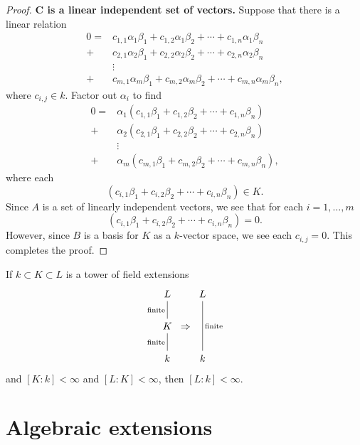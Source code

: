 \documentclass{ximera}
\begin{document}
\begin{lemma}
\begin{proof}
    \textbf{$\boldsymbol C$ is a linear independent set of vectors.}
    Suppose that there is a linear relation
    \begin{align*}
      0 = &c_{1,1} \alpha_1\beta_1 + c_{1,2} \alpha_1\beta_2 + \cdots + c_{1,n} \alpha_1\beta_n\\
      +&c_{2,1} \alpha_2\beta_1 + c_{2,2} \alpha_2\beta_2 + \cdots + c_{2,n} \alpha_2\beta_n\\
      &\vdots\\
      +&c_{m,1} \alpha_m\beta_1 + c_{m,2} \alpha_m\beta_2 + \cdots + c_{m,n} \alpha_m\beta_n,
    \end{align*}
    where $c_{i,j}\in k$. Factor out $\alpha_i$ to find
    \begin{align*}
      0 = &\alpha_1(c_{1,1} \beta_1 + c_{1,2} \beta_2 + \cdots + c_{1,n} \beta_n)\\
      +&\alpha_2(c_{2,1} \beta_1 + c_{2,2} \beta_2 + \cdots + c_{2,n} \beta_n)\\
      &\vdots\\
      +&\alpha_m(c_{m,1} \beta_1 + c_{m,2} \beta_2 + \cdots + c_{m,n} \beta_n),
    \end{align*}
    where each 
    \[
    (c_{i,1} \beta_1 + c_{i,2} \beta_2 + \cdots + c_{i,n} \beta_n)\in K.
    \]
    Since $A$ is a set of linearly independent vectors, we see that
    for each $i= 1,\dots, m$
    \[
    (c_{i,1} \beta_1 + c_{i,2} \beta_2 + \cdots + c_{i,n} \beta_n) = 0.
    \]
    However, since $B$ is a basis for $K$ as a $k$-vector space, we
    see each $c_{i,j}=0$. This completes the proof.
  \end{proof}
\end{lemma}

\begin{corollary}\label{C:fe}
  If $k\subset K\subset L$ is a tower of field extensions
  \[
  \begin{tikzcd}[column sep=0pt]
    L\ar[d,-,"\text{finite}",swap] & & L\ar[dd,-,"\text{finite}"]\\
    K \ar[d,-,"\text{finite}",swap] & \Rightarrow& \\
    k & \vphantom{K} & k
  \end{tikzcd}
  \]
  and $[K:k]<\infty$ and $[L:K]<\infty$, then $[L:k]<\infty$.
\end{corollary}



\section{Algebraic extensions}
\end{document}
